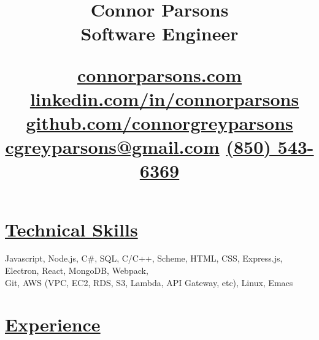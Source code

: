 \documentclass[11pt]{article}
\date{}
\title{\vspace{-4ex}\textbf{Connor Parsons}\\\medskip
\large Software Engineer\\\begin{normalsize}\href{https://connorparsons.com}{connorparsons.com} \textbullet\ \href{https://linkedin.com/in/connorparsons}{linkedin.com/in/connorparsons} \textbullet{} \href{https://github.com/connorgreyparsons}{github.com/connorgreyparsons}\\\href{mailto:cgreyparsons@gmail.com}{cgreyparsons@gmail.com} \textbullet{} \href{tel:8505436369}{(850) 543-6369}\vspace{-12ex}\end{normalsize}}
\begin{document}
\maketitle

\section*{\underline{Technical Skills}}
\label{sec:org2bfdcd8}
Javascript, Node.js, C\#, SQL, C/C++, Scheme, HTML, CSS, Express.js, Electron, React, MongoDB, Webpack,
\\Git, AWS (VPC, EC2, RDS, S3, Lambda, API Gateway, etc), Linux, Emacs

\section*{\underline{Experience}}
\label{sec:org4fc1666}
\end{document}
